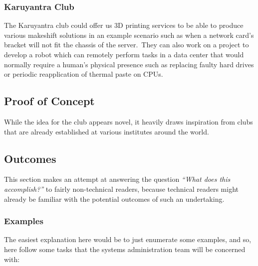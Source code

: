 \documentclass[a4paper,11pt,twocolumn,oneside]{book}
\begin{document}
    \subsubsection{Karuyantra Club}
    The Karuyantra club could offer us 3D printing services to be able to produce various makeshift solutions in an
    example scenario such as when a network card's bracket will not fit the chassis of the server.\ They can also
    work on a project to develop a robot which can remotely perform tasks in a data center that would normally require a
    human's physical presence such as replacing faulty hard drives or periodic reapplication of thermal paste on CPUs.


    \subsection{Proof of Concept}\label{subsec:proof-of-concept}

    While the idea for the club appears novel, it heavily draws inspiration from clubs that are already established at
    various institutes around the world.


    \subsection{Outcomes}\label{subsec:outcomes}
    This section makes an attempt at answering the question \emph{``What does this accomplish?''} to fairly
    non-technical readers, because technical readers might already be familiar with the potential outcomes of such an
    undertaking.

    \subsubsection{Examples}
    The easiest explanation here would be to just enumerate some examples, and so, here follow some tasks that the
    systems administration team will be concerned with:
\end{document}
